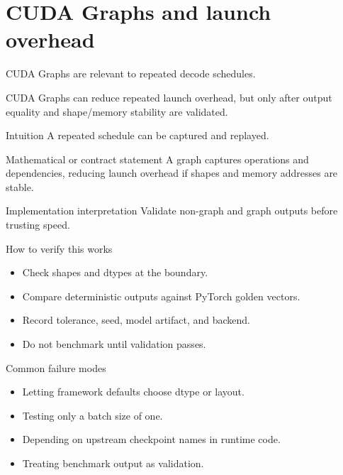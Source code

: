 \chapter{CUDA Graphs and launch overhead}
\label{ch:cuda-graphs}
CUDA Graphs are relevant to repeated decode schedules. \citep{cudaGraphsGuide}

CUDA Graphs can reduce repeated launch overhead, but only after output equality and shape/memory stability are validated. \citep{cudaGraphsGuide}

\begin{intuitionbox}{Intuition}
A repeated schedule can be captured and replayed.
\end{intuitionbox}

\begin{definitionbox}{Mathematical or contract statement}
A graph captures operations and dependencies, reducing launch overhead if shapes and memory addresses are stable.
\end{definitionbox}

\begin{implementationbox}{Implementation interpretation}
Validate non-graph and graph outputs before trusting speed.
\end{implementationbox}

\begin{verificationbox}{How to verify this works}
\begin{itemize}
\item Check shapes and dtypes at the boundary.
\item Compare deterministic outputs against PyTorch golden vectors.
\item Record tolerance, seed, model artifact, and backend.
\item Do not benchmark until validation passes.
\end{itemize}
\end{verificationbox}

\begin{warningbox}{Common failure modes}
\begin{itemize}
\item Letting framework defaults choose dtype or layout.
\item Testing only a batch size of one.
\item Depending on upstream checkpoint names in runtime code.
\item Treating benchmark output as validation.
\end{itemize}
\end{warningbox}

